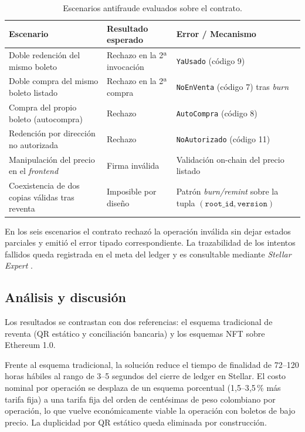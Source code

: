 \begin{table}[H]
\centering
\small
\renewcommand{\arraystretch}{1.3}
\caption{Escenarios antifraude evaluados sobre el contrato.}
\label{tab:antifraude}
\begin{tabularx}{\textwidth}{>{\raggedright\arraybackslash}p{5.0cm} >{\raggedright\arraybackslash}p{4.0cm}
>{\raggedright\arraybackslash}X}
\toprule
\rowcolor{rowgray}
\textbf{Escenario} & \textbf{Resultado esperado} & \textbf{Error / Mecanismo} \\
\midrule
Doble redención del mismo boleto & Rechazo en la 2ª invocación & \texttt{YaUsado} (código 9) \\
\rowcolor{rowgray}
Doble compra del mismo boleto listado & Rechazo en la 2ª compra & \texttt{NoEnVenta} (código 7) tras
\textit{burn} \\
Compra del propio boleto (autocompra) & Rechazo & \texttt{AutoCompra} (código 8) \\
\rowcolor{rowgray}
Redención por dirección no autorizada & Rechazo & \texttt{NoAutorizado} (código 11) \\
Manipulación del precio en el \textit{frontend} & Firma inválida & Validación on-chain del precio listado \\
\rowcolor{rowgray}
Coexistencia de dos copias válidas tras reventa & Imposible por diseño & Patrón \textit{burn/remint} sobre la
tupla \((\texttt{root\_id}, \texttt{version})\) \\
\bottomrule
\end{tabularx}
\end{table}

En los seis escenarios el contrato rechazó la operación inválida sin dejar estados parciales y emitió el
error tipado correspondiente. La trazabilidad de los intentos fallidos queda registrada en el meta del ledger
y es consultable mediante \textit{Stellar Expert} \cite{stellarexpert}.

\subsection{Análisis y discusión}

Los resultados se contrastan con dos referencias: el esquema tradicional de reventa (QR estático y
conciliación bancaria) y los esquemas NFT sobre Ethereum 1.0.

Frente al esquema tradicional, la solución reduce el tiempo de finalidad de 72--120 horas hábiles al rango de 3--5 segundos del cierre de ledger en Stellar. El costo nominal por operación se desplaza de un esquema porcentual (1{,}5--3{,}5\,\% más tarifa fija) a una tarifa fija del orden de centésimas de peso colombiano por operación, lo que vuelve económicamente viable la operación con boletos de bajo precio. La duplicidad por QR estático queda eliminada por construcción.

